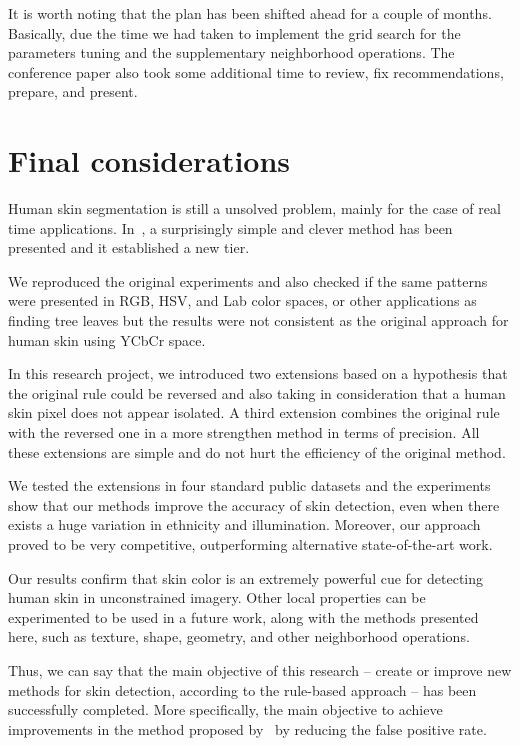 It is worth noting that the plan has been shifted ahead for a couple of months. Basically, due the time we had taken to implement the grid search for the parameters tuning and the supplementary neighborhood operations. The conference paper also took some additional time to review, fix recommendations, prepare, and present.


\section{Final considerations}
\label{sec:final_considerations}
Human skin segmentation is still a unsolved problem, mainly for the case of real time applications. In~\cite{brancati:17}, a surprisingly simple and clever method has been presented and it established a new tier.

We reproduced the original experiments and also checked if the same patterns were presented in RGB, HSV, and Lab color spaces, or other applications as finding tree leaves but the results were not consistent as the original approach for human skin using YCbCr space.

In this research project, we introduced two extensions based on a hypothesis that the original rule could be reversed and also taking in consideration that a human skin pixel does not appear isolated. A third extension combines the original rule with the reversed one in a more strengthen method in terms of precision. All these extensions are simple and do not hurt the efficiency of the original method.

We tested the extensions in four standard public datasets and the experiments show that our methods improve the accuracy of skin detection, even when there exists a huge variation in ethnicity and illumination. Moreover, our approach proved to be very competitive, outperforming alternative state-of-the-art work.

Our results confirm that skin color is an extremely powerful cue for detecting human skin in unconstrained imagery. Other local properties can be experimented to be used in a future work, along with the methods presented here, such as texture, shape, geometry, and other neighborhood operations.

Thus, we can say that the main objective of this research -- create or improve new methods for skin detection, according to the rule-based approach -- has been successfully completed. More specifically, the main objective to achieve improvements in the method proposed by~\citet{brancati:17} by reducing the false positive rate.

